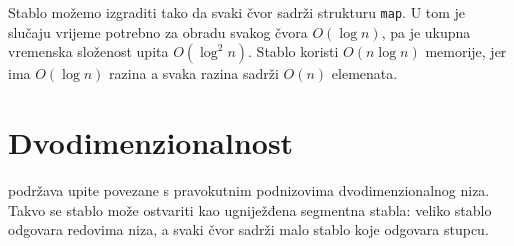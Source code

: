Stablo možemo izgraditi tako
da svaki čvor sadrži strukturu \texttt{map}.
U tom je slučaju vrijeme potrebno za obradu svakog
čvora $O(\log n)$, pa je ukupna vremenska složenost
upita $O(\log^2 n)$.
Stablo koristi $O(n \log n)$ memorije,
jer ima $O(\log n)$ razina
a svaka razina sadrži
$O(n)$ elemenata.

\section{Dvodimenzionalnost}


 podržava
upite povezane s pravokutnim podnizovima
dvodimenzionalnog niza.
Takvo se stablo može ostvariti kao
ugniježđena segmentna stabla: veliko stablo odgovara
redovima niza, a svaki čvor sadrži malo stablo
koje odgovara stupcu.

